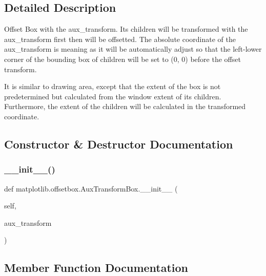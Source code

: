 \subsection{Detailed Description}
\begin{DoxyVerb}Offset Box with the aux_transform. Its children will be
transformed with the aux_transform first then will be
offsetted. The absolute coordinate of the aux_transform is meaning
as it will be automatically adjust so that the left-lower corner
of the bounding box of children will be set to (0, 0) before the
offset transform.

It is similar to drawing area, except that the extent of the box
is not predetermined but calculated from the window extent of its
children. Furthermore, the extent of the children will be
calculated in the transformed coordinate.
\end{DoxyVerb}
 

\subsection{Constructor \& Destructor Documentation}
\mbox{\label{classmatplotlib_1_1offsetbox_1_1AuxTransformBox_a0d11eb99b83fba6579fce00c46bcc706}} 
\subsubsection{\texorpdfstring{\+\_\+\+\_\+init\+\_\+\+\_\+()}{\_\_init\_\_()}}
{\footnotesize\ttfamily def matplotlib.\+offsetbox.\+Aux\+Transform\+Box.\+\_\+\+\_\+init\+\_\+\+\_\+ (\begin{DoxyParamCaption}\item[{}]{self,  }\item[{}]{aux\+\_\+transform }\end{DoxyParamCaption})}



\subsection{Member Function Documentation}
\mbox{\label{classmatplotlib_1_1offsetbox_1_1AuxTransformBox_a4f81b602b7d9f9ea481b880bab755ed7}} 
